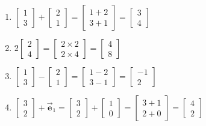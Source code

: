 \documentclass{article}
\begin{document}
\begin{enumerate}
\item 
$
\begin{bmatrix}1\\3\end{bmatrix}
+
\begin{bmatrix}2\\1\end{bmatrix}=
\begin{bmatrix}1+2\\3+1\end{bmatrix}=
\begin{bmatrix}3\\4\end{bmatrix}
$

\item
$
2\begin{bmatrix}2\\4\end{bmatrix}=
\begin{bmatrix}2 \times 2\\2 \times 4\end{bmatrix}=
\begin{bmatrix}4\\8\end{bmatrix}
$

\item 
$
\begin{bmatrix}1\\3\end{bmatrix}
-
\begin{bmatrix}2\\1\end{bmatrix}=
\begin{bmatrix}1-2\\3-1\end{bmatrix}=
\begin{bmatrix}-1\\2\end{bmatrix}
$

\item
$
\begin{bmatrix}3\\2\end{bmatrix} + \vec{\mathbf{e}}_1=
\begin{bmatrix}3\\2\end{bmatrix}
+
\begin{bmatrix}1\\0\end{bmatrix}=
\begin{bmatrix}3+1\\2+0\end{bmatrix}=
\begin{bmatrix}4\\2\end{bmatrix}
$
\end{enumerate}
\end{document}
